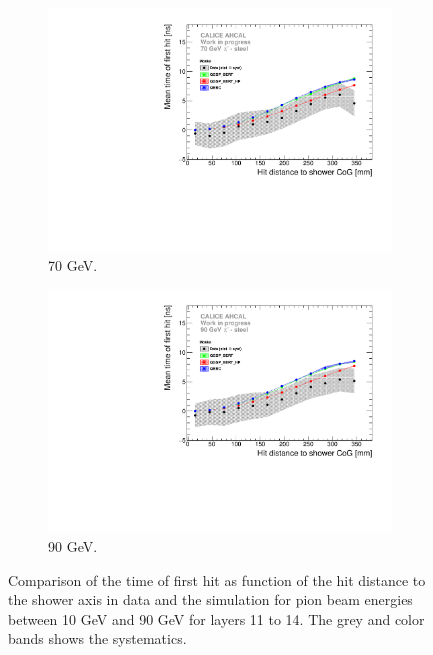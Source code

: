 \begin{figure}[htbp!]
\begin{subfigure}[t]{0.49\textwidth}
    \includegraphics[width=1\textwidth]{../Thesis_Plots/Timing/Pions/Plots/ComparisonToSim/Time_Radius_70GeV_BL_Mokka.pdf}
    \caption{70 GeV.} \label{fig:Radius_BL_SimData_70GeV}
  \end{subfigure}
  \hfill
  \begin{subfigure}[t]{0.49\textwidth}
    \centering
    \includegraphics[width=1\textwidth]{../Thesis_Plots/Timing/Pions/Plots/ComparisonToSim/Time_Radius_90GeV_BL_Mokka.pdf}
    \caption{90 GeV.} \label{fig:Radius_BL_SimData_90GeV}
  \end{subfigure}
  \caption{Comparison of the time of first hit as function of the hit distance to the shower axis in data and the \mokka simulation for pion beam energies between 10 GeV and 90 GeV for layers 11 to 14. The grey and color bands shows the systematics.}
\end{figure}

